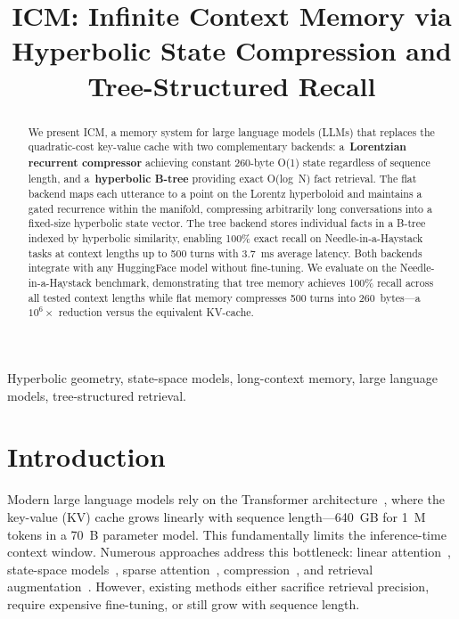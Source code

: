 \documentclass[conference]{IEEEtran}
\title{ICM: Infinite Context Memory via Hyperbolic State Compression and Tree-Structured Recall}
\author{\IEEEauthorblockN{C. B. Varshini}
\IEEEauthorblockA{Independent Researcher\\
Email: varshinicb1@github.com\\
Code: \url{https://github.com/varshinicb1/hyper-ssm-ultimate}}
}
\begin{document}
\maketitle

\begin{abstract}
We present ICM, a memory system for large language models (LLMs) that replaces the quadratic-cost key-value cache with two complementary backends: a~\textbf{Lorentzian recurrent compressor} achieving constant 260-byte O(1) state regardless of sequence length, and a~\textbf{hyperbolic B-tree} providing exact O(log~N) fact retrieval. The flat backend maps each utterance to a point on the Lorentz hyperboloid and maintains a gated recurrence within the manifold, compressing arbitrarily long conversations into a fixed-size hyperbolic state vector. The tree backend stores individual facts in a B-tree indexed by hyperbolic similarity, enabling 100\% exact recall on Needle-in-a-Haystack tasks at context lengths up to 500 turns with 3.7~ms average latency. Both backends integrate with any HuggingFace model without fine-tuning. We evaluate on the Needle-in-a-Haystack benchmark, demonstrating that tree memory achieves 100\% recall across all tested context lengths while flat memory compresses 500 turns into 260~bytes---a~$10^6\times$ reduction versus the equivalent KV-cache.
\end{abstract}

\begin{IEEEkeywords}
Hyperbolic geometry, state-space models, long-context memory, large language models, tree-structured retrieval.
\end{IEEEkeywords}

\section{Introduction}

Modern large language models rely on the Transformer architecture~\cite{vaswani2017attention}, where the key-value (KV) cache grows linearly with sequence length---640~GB for 1~M tokens in a 70~B parameter model. This fundamentally limits the inference-time context window. Numerous approaches address this bottleneck: linear attention~\cite{katharopoulos2020linear}, state-space models~\cite{gu2023mamba}, sparse attention~\cite{child2019generating,beltagy2020longformer}, compression~\cite{rae2020compressive}, and retrieval augmentation~\cite{lewis2020retrieval}. However, existing methods either sacrifice retrieval precision, require expensive fine-tuning, or still grow with sequence length.
\end{document}
